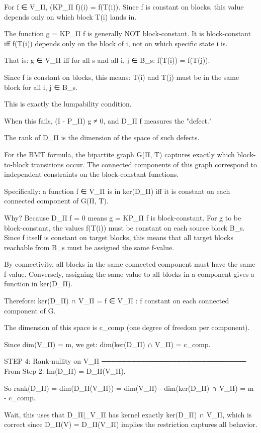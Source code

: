 For f ∈ V_Π, (KP_Π f)(i) = f(T(i)). Since f is constant on blocks, this
value depends only on which block T(i) lands in.

The function g = KP_Π f is generally NOT block-constant. It is block-constant
iff f(T(i)) depends only on the block of i, not on which specific state i is.

That is: g ∈ V_Π iff for all s and all i, j ∈ B_s:
f(T(i)) = f(T(j)).

Since f is constant on blocks, this means: T(i) and T(j) must be in the
same block for all i, j ∈ B_s.

This is exactly the lumpability condition.

When this fails, (I - P_Π) g ≠ 0, and D_Π f measures the "defect."

The rank of D_Π is the dimension of the space of such defects.

For the BMT formula, the bipartite graph G(Π, T) captures exactly which
block-to-block transitions occur. The connected components of this graph
correspond to independent constraints on the block-constant functions.

Specifically: a function f ∈ V_Π is in ker(D_Π) iff it is constant on
each connected component of G(Π, T).

Why? Because D_Π f = 0 means g = KP_Π f is block-constant.
For g to be block-constant, the values f(T(i)) must be constant on each
source block B_s. Since f itself is constant on target blocks, this means
that all target blocks reachable from B_s must be assigned the same f-value.

By connectivity, all blocks in the same connected component must have the
same f-value. Conversely, assigning the same value to all blocks in a
component gives a function in ker(D_Π).

Therefore:
ker(D_Π) ∩ V_Π = {f ∈ V_Π : f constant on each connected component of G}.

The dimension of this space is c_comp (one degree of freedom per component).

Since dim(V_Π) = m, we get:
dim(ker(D_Π) ∩ V_Π) = c_comp.

STEP 4: Rank-nullity on V_Π
─────────────────────────────
From Step 2: Im(D_Π) = D_Π(V_Π).

So rank(D_Π) = dim(D_Π(V_Π)) = dim(V_Π) - dim(ker(D_Π) ∩ V_Π) = m - c_comp.

Wait, this uses that D_Π|_{V_Π} has kernel exactly ker(D_Π) ∩ V_Π, which is
correct since D_Π(V) = D_Π(V_Π) implies the restriction captures all behavior.

